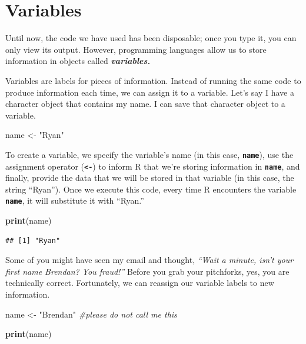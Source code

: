 \documentclass[
]{book}
\newenvironment{Shaded}{\begin{snugshade}}{\end{snugshade}}
\newcommand{\CommentTok}[1]{\textcolor[rgb]{0.56,0.35,0.01}{\textit{#1}}}
\newcommand{\FunctionTok}[1]{\textcolor[rgb]{0.13,0.29,0.53}{\textbf{#1}}}
\newcommand{\NormalTok}[1]{#1}
\newcommand{\OtherTok}[1]{\textcolor[rgb]{0.56,0.35,0.01}{#1}}
\newcommand{\StringTok}[1]{\textcolor[rgb]{0.31,0.60,0.02}{#1}}
\begin{document}
\section{Variables}\label{variables}

Until now, the code we have used has been disposable; once you type it, you can only view its output. However, programming languages allow us to store information in objects called \textbf{\emph{variables.}}

Variables are labels for pieces of information. Instead of running the same code to produce information each time, we can assign it to a variable. Let's say I have a character object that contains my name. I can save that character object to a variable.

\begin{Shaded}
\begin{Highlighting}[]
\NormalTok{name }\OtherTok{\textless{}{-}} \StringTok{"Ryan"}
\end{Highlighting}
\end{Shaded}

To create a variable, we specify the variable's name (in this case, \textbf{\texttt{name}}), use the assignment operator (\textbf{\texttt{\textless{}-}}) to inform R that we're storing information in \textbf{\texttt{name}}, and finally, provide the data that we will be stored in that variable (in this case, the string ``Ryan''). Once we execute this code, every time R encounters the variable \textbf{\texttt{name}}, it will substitute it with ``Ryan.''

\begin{Shaded}
\begin{Highlighting}[]
\FunctionTok{print}\NormalTok{(name)}
\end{Highlighting}
\end{Shaded}

\begin{verbatim}
## [1] "Ryan"
\end{verbatim}

Some of you might have seen my email and thought, \emph{``Wait a minute, isn't your first name Brendan? You fraud!''} Before you grab your pitchforks, yes, you are technically correct. Fortunately, we can reassign our variable labels to new information.

\begin{Shaded}
\begin{Highlighting}[]
\NormalTok{name }\OtherTok{\textless{}{-}} \StringTok{"Brendan"} \CommentTok{\#please do not call me this}

\FunctionTok{print}\NormalTok{(name)}
\end{Highlighting}
\end{Shaded}
\end{document}
